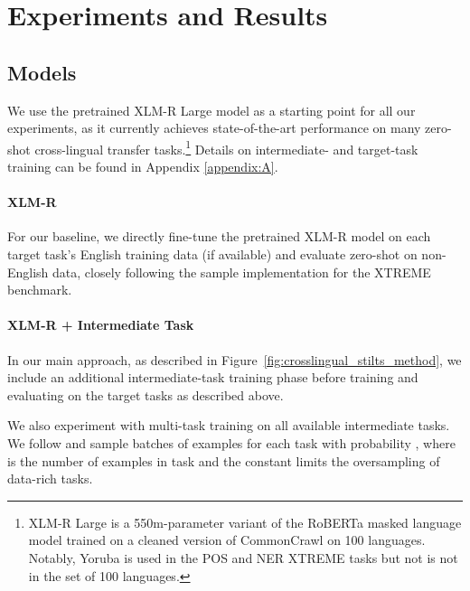 \documentclass[11pt,a4paper]{article}
\begin{document}
\section{Experiments and Results}


\subsection{Models}
\label{sec:models}

We use the pretrained XLM-R Large model \citep{conneau2019xlmr} as a starting point for all our experiments, as it currently achieves state-of-the-art performance on many zero-shot cross-lingual transfer tasks.\footnote{XLM-R Large \citep{conneau2019xlmr} is a 550m-parameter variant of the RoBERTa masked language model \citep{liu2019roberta} trained on a cleaned version of CommonCrawl on 100 languages. Notably, Yoruba is used in the POS and NER XTREME tasks but not is not in the set of 100 languages.} Details on intermediate- and target-task training can be found in Appendix \ref{appendix:A}.

\paragraph{XLM-R} For our baseline, we directly fine-tune the pretrained XLM-R model on each target task's English training data (if available) and evaluate zero-shot on non-English data, closely following the sample implementation for the XTREME benchmark.

\paragraph{XLM-R + Intermediate Task} In our main approach, as described in Figure~\ref{fig:crosslingual_stilts_method}, we include an additional intermediate-task training phase before training and evaluating on the target tasks as described above.

We also experiment with multi-task training on all available intermediate tasks.
We follow \citet{raffel2019t5paper} and sample batches of examples for each task with probability , where  is the number of examples in task  and the constant  limits the oversampling of data-rich tasks.
\end{document}
